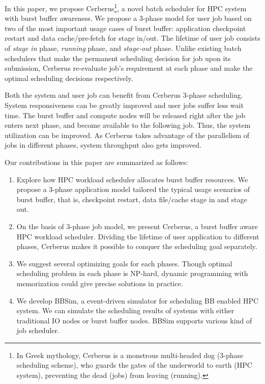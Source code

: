 In this paper, we propose Cerberus\footnote{In Greek mythology,
Cerberus is a monstrous multi-headed dog (3-phase scheduling scheme),
who guards the gates of the underworld to earth (HPC system),
preventing the dead (jobs) from leaving (running).},
a novel batch scheduler for HPC system with burst buffer awareness. 
We propose a 3-phase model for user job 
based on two of the most important usage cases of burst buffer: 
application checkpoint restart and data cache/pre-fetch for stage in/out. 
The lifetime of user job consists of \textit{stage in} phase, 
\textit{running} phase, and \textit{stage-out} phase. 
Unlike existing batch schedulers that 
make the permanent scheduling decision for job upon its submission, 
Cerberus re-evaluate job's requirement at each phase 
and make the optimal scheduling decisions respectively.

Both the system and user job can benefit from Cerberus 3-phase scheduling.
System responsiveness can be greatly improved and
user jobs suffer less wait time. 
The burst buffer and compute nodes will be released right after the job enters next phase,
and become available to the following job.
Thus, the system utilization can be improved.
As Cerberus takes advantage of the parallelism of jobs in different phases,
system throughput also gets improved.

Our contributions in this paper are summarized as follows:

\begin{enumerate}
        \item Explore how HPC workload scheduler allocates burst buffer resources.
                We propose a 3-phase application model tailored the typical
                usage scenarios of burst buffer, that is, checkpoint restart,
                data file/cache stage in and stage out.
        \item On the basis of 3-phase job model, we present Cerberus,
                a burst buffer aware HPC workload scheduler.
                Dividing the lifetime of user application to different phases,
                Cerberus makes it possible to conquer the scheduling goal separately.
        \item We suggest several optimizing goals for each phases.
                Though optimal scheduling problem in each phase is NP-hard,
                dynamic programming with memorization could give precise solutions
                in practice.
        \item We develop BBSim, a event-driven simulator for scheduling
                BB enabled HPC system. We can simulate the scheduling results of
                systems with either traditional IO nodes or burst buffer nodes.
                BBSim supports various kind of job scheduler.
\end{enumerate}

